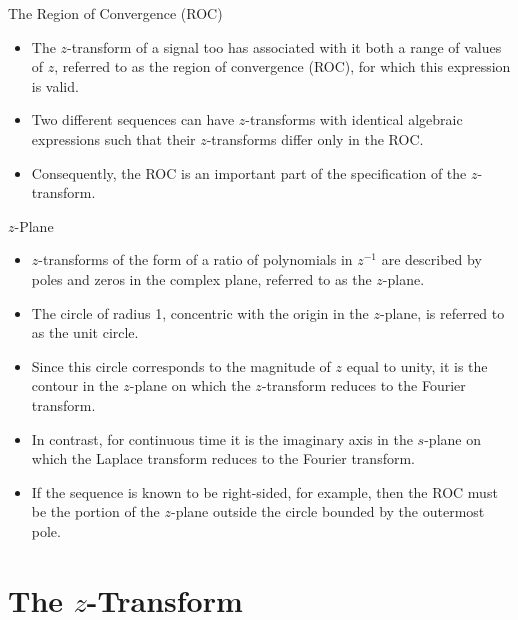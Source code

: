 \begin{frame}{The Region of Convergence (ROC)}
    \begin{itemize}
        \item The $z$-transform of a signal too has associated with it both  a range of values of $z$, referred to as the region of convergence (ROC), for which this expression is valid.
        \item Two different sequences can have $z$-transforms with identical algebraic expressions such that their $z$-transforms differ only in the ROC.
        \item Consequently, the ROC is an important part of the specification of the $z$-transform.
    \end{itemize}
\end{frame}


\begin{frame}{$z$-Plane}
    \begin{itemize}
        \item $z$-transforms of the form of a ratio of polynomials in $z^{-1}$ are described by poles and zeros in the complex plane, referred to as the $z$-plane.
        \item The circle of radius 1, concentric with the origin in the $z$-plane, is  referred to as the \alert{unit circle}.
        \item Since this circle corresponds to the magnitude of $z$ equal to unity, it is the contour in the $z$-plane on which the $z$-transform reduces to the Fourier transform.
        \item In contrast, for continuous time it is the imaginary axis in the $s$-plane on which the Laplace transform reduces to the Fourier transform.
        \item If the sequence is known to be right-sided, for example, then the ROC must be the portion of the $z$-plane outside the circle bounded by the outermost pole.
    \end{itemize}
\end{frame}

\section{The $z$-Transform}

